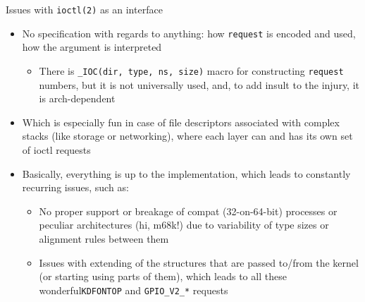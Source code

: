 \documentclass[unicode,aspectratio=169]{beamer}
\begin{document}
\begin{frame}{Issues with \texttt{ioctl(2)} as an interface}
\begin{itemize}
  \item No specification with regards to anything: how \texttt{request}
        is encoded and used, how the argument is interpreted
  \begin{itemize}
    \item There is \texttt{\_IOC(dir, type, ns, size)} macro for constructing
          \texttt{request}  numbers, but it is not universally used,
	  and, to add insult to the injury, it is arch-dependent
  \end{itemize}
  \item Which is especially fun in case of file descriptors associated
        with complex stacks (like storage or networking), where each layer
        can and has its own set of ioctl requests
  \item Basically, everything is up to the implementation, which leads
        to constantly recurring issues, such as:
  \begin{itemize}
    \item No proper support or breakage of compat (32-on-64-bit) processes
          or peculiar architectures (hi, m68k!)
          due to variability of type sizes or alignment rules between them
    \item Issues with extending of the structures that are passed to/from
          the kernel (or starting using parts of them), which leads to all
	  these wonderful\footnotemark[1] \texttt{KDFONTOP}
	  and \texttt{GPIO\_V2\_*} requests
  \end{itemize}
\end{itemize}
\end{frame}
\end{document}
